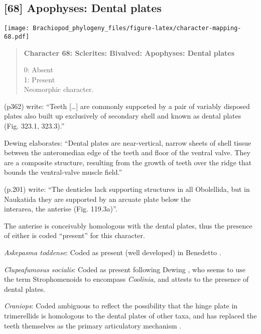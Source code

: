 \documentclass[openany]{book}
\theoremstyle{definition}
\theoremstyle{definition}
\theoremstyle{definition}
\theoremstyle{remark}
\begin{document}
\subsection*{{[}68{]} Apophyses: Dental
plates}\label{apophyses-dental-plates}

\texttt{[image: Brachiopod\_phylogeny\_files/figure-latex/character-mapping-68.pdf]}

\begin{quote}
\textbf{Character 68: Sclerites: Bivalved: Apophyses: Dental plates}

0: Absent\\
1: Present\\
Neomorphic character.
\end{quote}

\citet{Williams1997Introduction} (p362) write: ``Teeth {[}\ldots{}{]}
are commonly supported by a pair of variably disposed plates also built
up exclusively of secondary shell and known as dental plates (Fig.
323.1, 323.3).''

Dewing \citeyearpar{Dewing2001Hingemodifications} elaborates: ``Dental
plates are near-vertical, narrow sheets of shell tissue between the
anteromedian edge of the teeth and floor of the ventral valve. They are
a composite structure, resulting from the growth of teeth over the ridge
that bounds the ventral-valve muscle field.''

\citet{Williams2000LinguliformeaCraniiformea} (p.201) write: ``The
denticles lack supporting structures in all Obolellida, but in Naukatida
they are supported by an arcuate plate below the\\
interarea, the anterise (Fig. 119.3a)''.

The anterise is conceivably homologous with the dental plates, thus the
presence of either is coded ``present'' for this character.

\hypertarget{Askepasma_toddense-coding-68}{}
\emph{Askepasma toddense}: Coded as present (well developed) in
Benedetto \citeyearpar{Benedetto2009iChaniella}.

\hypertarget{Clupeafumosus_socialis-coding-68}{}
\emph{Clupeafumosus socialis}: Coded as present following Dewing
\citeyearpar{Dewing2001Hingemodifications}, who seems to use the term
Strophomenoids to encompass \emph{Coolinia}, and attests to the presence
of dental plates.

\hypertarget{Craniops-coding-68}{}
\emph{Craniops}: Coded ambiguous to reflect the possibility that the
hinge plate in trimerellids is homologous to the dental plates of other
taxa, and has replaced the teeth themselves as the primary articulatory
mechanism \citep[see][p.~184, for details of the
articulation]{Williams2000LinguliformeaCraniiformea}.
\end{document}
